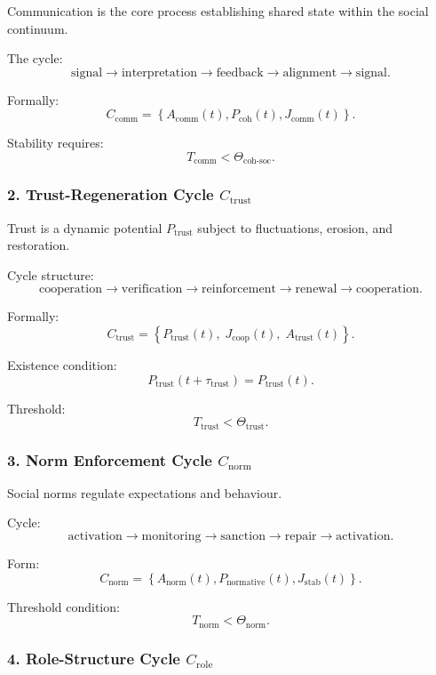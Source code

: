 Communication is the core process establishing shared state within the social
continuum.

The cycle:
\[
  \mathrm{signal}
  \to
  \mathrm{interpretation}
  \to
  \mathrm{feedback}
  \to
  \mathrm{alignment}
  \to
  \mathrm{signal}.
\]

Formally:
\[
  C_{\mathrm{comm}}
    =
    \left\{
      A_{\mathrm{comm}}(t),
      P_{\mathrm{coh}}(t),
      J_{\mathrm{comm}}(t)
    \right\}.
\]

Stability requires:
\[
  T_{\mathrm{comm}} < \Theta_{\mathrm{coh\text{-}soc}}.
\]

\subsubsection{2. Trust-Regeneration Cycle $C_{\mathrm{trust}}$}

Trust is a dynamic potential $P_{\mathrm{trust}}$ subject to fluctuations,
erosion, and restoration.

Cycle structure:
\[
  \mathrm{cooperation}
  \to
  \mathrm{verification}
  \to
  \mathrm{reinforcement}
  \to
  \mathrm{renewal}
  \to
  \mathrm{cooperation}.
\]

Formally:
\[
 C_{\mathrm{trust}}
   =
   \left\{
     P_{\mathrm{trust}}(t),\;
     J_{\mathrm{coop}}(t),\;
     A_{\mathrm{trust}}(t)
   \right\}.
\]

Existence condition:
\[
  P_{\mathrm{trust}}(t+\tau_{\mathrm{trust}})=
  P_{\mathrm{trust}}(t).
\]

Threshold:
\[
  T_{\mathrm{trust}} < \Theta_{\mathrm{trust}}.
\]

\subsubsection{3. Norm Enforcement Cycle $C_{\mathrm{norm}}$}

Social norms regulate expectations and behaviour.

Cycle:
\[
  \mathrm{activation}
  \to
  \mathrm{monitoring}
  \to
  \mathrm{sanction}
  \to
  \mathrm{repair}
  \to
  \mathrm{activation}.
\]

Form:
\[
  C_{\mathrm{norm}}=
  \left\{
    A_{\mathrm{norm}}(t),
    P_{\mathrm{normative}}(t),
    J_{\mathrm{stab}}(t)
  \right\}.
\]

Threshold condition:
\[
  T_{\mathrm{norm}} < \Theta_{\mathrm{norm}}.
\]

\subsubsection{4. Role-Structure Cycle $C_{\mathrm{role}}$}

